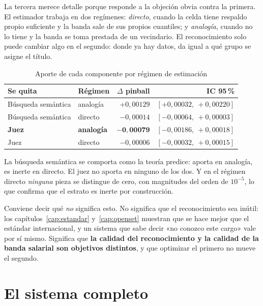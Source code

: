 \documentclass[12pt,a4paper,oneside]{report}
\begin{document}
La tercera merece detalle porque responde a la objeción obvia contra la primera. El
estimador trabaja en dos regímenes: \emph{directo}, cuando la celda tiene respaldo propio
suficiente y la banda sale de sus propios cuantiles; y \emph{analogía}, cuando no lo tiene y
la banda se toma prestada de un vecindario. El reconocimiento solo puede cambiar algo en el
segundo: donde ya hay datos, da igual a qué grupo se asigne el título.

\begin{table}[h]
\centering
\caption{Aporte de cada componente por régimen de estimación}
\label{tab:regimen}
\begin{tabular}{llrr}
\toprule
Se quita & Régimen & $\Delta$ pinball & IC 95\,\% \\
\midrule
Búsqueda semántica & analogía & $+0{,}00129$ & $[+0{,}00032,\ +0{,}00220]$ \\
Búsqueda semántica & directo  & $-0{,}00014$ & $[-0{,}00064,\ +0{,}00003]$ \\
\textbf{Juez} & \textbf{analogía} & $\mathbf{-0{,}00079}$ & $[-0{,}00186,\ +0{,}00018]$ \\
Juez & directo & $-0{,}00006$ & $[-0{,}00032,\ +0{,}00015]$ \\
\bottomrule
\end{tabular}
\end{table}

La búsqueda semántica se comporta como la teoría predice: aporta en analogía, es inerte en
directo. El juez no aporta en ninguno de los dos. Y en el régimen directo \emph{ninguna}
pieza se distingue de cero, con magnitudes del orden de $10^{-5}$, lo que confirma que el
estrato es inerte por construcción.

Conviene decir qué \emph{no} significa esto. No significa que el reconocimiento sea inútil:
los capítulos~\ref{cap:estandar} y~\ref{cap:openset} muestran que se hace mejor que el
estándar internacional, y un sistema que sabe decir «no conozco este cargo» vale por sí
mismo. Significa que \textbf{la calidad del reconocimiento y la calidad de la banda salarial
son objetivos distintos}, y que optimizar el primero no mueve el segundo.

\chapter{El sistema completo}
\label{cap:sistema}
\end{document}
